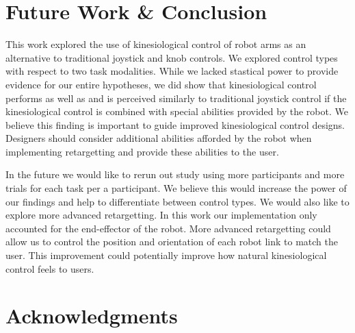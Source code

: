 \documentclass{sigchi}
\newcommand\tabhead[1]{\small\textbf{#1}}
\begin{document}
\section{Future Work \& Conclusion}

This work explored the use of kinesiological control of robot arms as an alternative to traditional joystick and knob controls. We explored control types with respect to two task modalities. While we lacked stastical power to provide evidence for our entire hypotheses, we did show that kinesiological control performs as well as and is perceived similarly to traditional joystick control if the kinesiological control is combined with special abilities provided by the robot. We believe this finding is important to guide improved kinesiological control designs. Designers should consider additional abilities afforded by the robot when implementing retargetting and provide these abilities to the user.

In the future we would like to rerun out study using more participants and more trials for each task per a participant. We believe this would increase the power of our findings and help to differentiate between control types. We would also like to explore more advanced retargetting. In this work our implementation only accounted for the end-effector of the robot. More advanced retargetting could allow us to control the position and orientation of each robot link to match the user. This improvement could potentially improve how natural kinesiological control feels to users.



\section{Acknowledgments}
\end{document}
